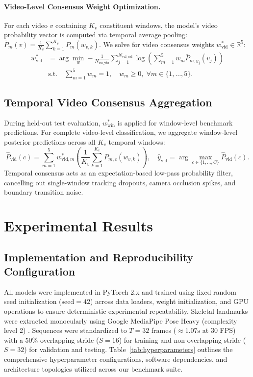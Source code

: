 \documentclass[runningheads]{llncs}
\begin{document}
\paragraph{Video-Level Consensus Weight Optimization.} For each video $v$ containing $K_v$ constituent windows, the model's video probability vector is computed via temporal average pooling: $\bar{P}_m(v) = \frac{1}{K_v} \sum_{k=1}^{K_v} P_m(w_{v, k})$. We solve for video consensus weights $w_{\text{vid}}^* \in \mathbb{R}^5$:
\begin{equation}
\begin{aligned}
    w_{\text{vid}}^* &= \arg\min_{w} -\frac{1}{N_{\text{val\_vid}}} \sum_{j=1}^{N_{\text{val\_vid}}} \log \left( \sum_{m=1}^5 w_m \bar{P}_{m, y_j}(v_j) \right) \\
    &\text{s.t.} \quad \sum_{m=1}^5 w_m = 1, \quad w_m \ge 0, \; \forall m \in \{1, \dots, 5\}.
\end{aligned}
\end{equation}

\subsection{Temporal Video Consensus Aggregation}
During held-out test evaluation, $w_{\text{win}}^*$ is applied for window-level benchmark predictions. For complete video-level classification, we aggregate window-level posterior predictions across all $K_v$ temporal windows:
\begin{equation}
    \hat{P}_{\text{vid}}(c) = \sum_{m=1}^5 w_{\text{vid}, m}^* \left( \frac{1}{K_v} \sum_{k=1}^{K_v} P_{m, c}(w_{v, k}) \right), \quad \hat{y}_{\text{vid}} = \arg\max_{c \in \{1, \dots, C\}} \hat{P}_{\text{vid}}(c).
\end{equation}
Temporal consensus acts as an expectation-based low-pass probability filter, cancelling out single-window tracking dropouts, camera occlusion spikes, and boundary transition noise.

\section{Experimental Results}

\subsection{Implementation and Reproducibility Configuration}
All models were implemented in PyTorch 2.x \cite{paszke2019} and trained using fixed random seed initialization ($\text{seed} = 42$) across data loaders, weight initialization, and GPU operations to ensure deterministic experimental repeatability. Skeletal landmarks were extracted monocularly using Google MediaPipe Pose Heavy (complexity level 2) \cite{chuankun2019,bazarevsky2020}. Sequences were standardized to $T=32$ frames ($\approx 1.07\text{s}$ at 30 FPS) with a 50\% overlapping stride ($S=16$) for training and non-overlapping stride ($S=32$) for validation and testing. Table~\ref{tab:hyperparameters} outlines the comprehensive hyperparameter configurations, software dependencies, and architecture topologies utilized across our benchmark suite.
\end{document}
